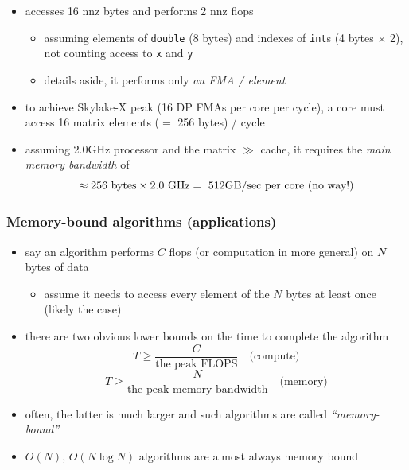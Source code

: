 \documentclass[12pt,dvipdfmx]{beamer}
\newcommand{\ao}[1]{{\color{blue}#1}}
\newcommand{\aka}[1]{{\color{red}#1}}
\begin{document}
\begin{frame}[fragile]
\begin{itemize}
\item<2-> accesses \ao{16 nnz} bytes and performs \ao{2 nnz} flops
  \begin{itemize}
  \item assuming elements of {\tt double} (8 bytes) and indexes of {\tt int}s (4 bytes $\times$ 2), not counting access to {\tt x} and {\tt y}
  \item details aside, it performs only \ao{\it an FMA / element}
  \end{itemize}

\item<3-> to achieve Skylake-X peak (\ao{16 DP FMAs} per core per cycle),
  a core must access \ao{16} matrix elements ($=$ \ao{256} bytes) / cycle

\item<4-> assuming 2.0GHz processor and the matrix $\gg$ cache,
  it requires the \ao{\it main memory bandwidth} of
\[ \approx 256 \mbox{ bytes} \times 2.0\mbox{ GHz} = \mbox{\aka{ 512GB/sec per core (no way!)}} \]
\end{itemize}
\end{frame}

\begin{frame}[fragile]
  \frametitle{Memory-bound algorithms (applications)}
\begin{itemize}
\item<1-> say an algorithm
  performs \ao{$C$} flops (or computation in more general) on \ao{$N$}
  bytes of data
  \begin{itemize}
  \item assume it needs to access every element of
    the $N$ bytes at least once (likely the case)
  \end{itemize}
\item<2->
  there are two obvious lower bounds on the time to complete the algorithm
  \[ T \geq \frac{C}{\mbox{the peak FLOPS}} \quad \mbox{(compute)} \]
  \[ T \geq \frac{N}{\mbox{the peak memory bandwidth}} \quad \mbox{(memory)} \]
\item<3-> often, the latter is much larger and such algorithms are called
  \ao{\it ``memory-bound''}
\item<3-> $O(N)$, $O(N \log N)$ algorithms are almost always memory bound
\end{itemize}
\end{frame}
\end{document}

